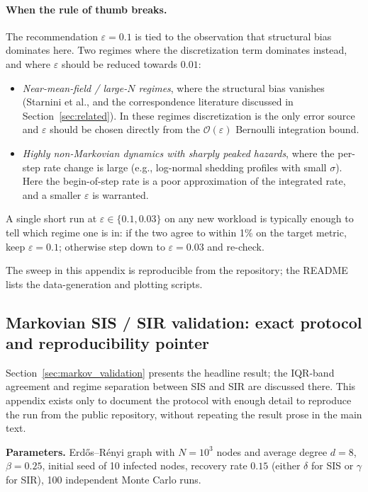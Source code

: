 \documentclass[a4paper,fleqn]{cas-sc}
\theoremstyle{definition}
\theoremstyle{remark}
\newcommand{\bigO}{\mathcal{O}}
\begin{document}
\paragraph{When the rule of thumb breaks.}
The recommendation $\varepsilon = 0.1$ is tied to the observation that structural bias dominates here. Two regimes where the discretization term dominates instead, and where $\varepsilon$ should be reduced towards $0.01$:
\begin{itemize}
\item \emph{Near-mean-field / large-$N$ regimes}, where the structural bias vanishes (Starnini et al., and the correspondence literature discussed in Section~\ref{sec:related}). In these regimes discretization is the only error source and $\varepsilon$ should be chosen directly from the $\bigO(\varepsilon)$ Bernoulli integration bound.
\item \emph{Highly non-Markovian dynamics with sharply peaked hazards}, where the per-step rate change is large (e.g., log-normal shedding profiles with small $\sigma$). Here the begin-of-step rate is a poor approximation of the integrated rate, and a smaller $\varepsilon$ is warranted.
\end{itemize}
A single short run at $\varepsilon \in \{0.1, 0.03\}$ on any new workload is typically enough to tell which regime one is in: if the two agree to within 1\% on the target metric, keep $\varepsilon = 0.1$; otherwise step down to $\varepsilon = 0.03$ and re-check.

The sweep in this appendix is reproducible from the repository; the README lists the data-generation and plotting scripts.

\subsection{Markovian SIS / SIR validation: exact protocol and reproducibility pointer}
\label{app:sis_sir}

Section~\ref{sec:markov_validation} presents the headline result; the IQR-band agreement and regime separation between SIS and SIR are discussed there. This appendix exists only to document the protocol with enough detail to reproduce the run from the public repository, without repeating the result prose in the main text.

\textbf{Parameters.} Erd\H{o}s--R\'{e}nyi graph with $N = 10^3$ nodes and average degree $d = 8$, $\beta = 0.25$, initial seed of 10 infected nodes, recovery rate $0.15$ (either $\delta$ for SIS or $\gamma$ for SIR), 100 independent Monte Carlo runs.
\end{document}
